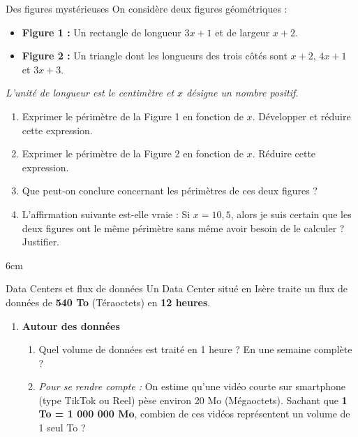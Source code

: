 \documentclass[a4paper]{book}
\begin{document}
{    
\newpage
    
    
    \begin{exerciceTitre}{Des figures mystérieuses}
        On considère deux figures géométriques :
        \begin{itemize}
            \item \textbf{Figure 1 :} Un rectangle de longueur $3x + 1$ et de largeur $x + 2$.
            \item \textbf{Figure 2 :} Un triangle dont les longueurs des trois côtés sont $x + 2$, $4x + 1$ et $3x + 3$.
        \end{itemize}
        \textit{L'unité de longueur est le centimètre et $x$ désigne un nombre positif.}
        
        \begin{enumerate}
            \item Exprimer le périmètre de la Figure 1 en fonction de $x$. Développer et réduire cette expression.
            \item Exprimer le périmètre de la Figure 2 en fonction de $x$. Réduire cette expression.
            \item Que peut-on conclure concernant les périmètres de ces deux figures ? 
            \item L'affirmation suivante est-elle vraie : \og Si $x = 10,5$, alors je suis certain que les deux figures ont le même périmètre sans même avoir besoin de le calculer \fg{} ? Justifier.
        \end{enumerate}
        \begin{ZoneReponse}{6cm}
        \end{ZoneReponse}
    \end{exerciceTitre}
    
        
    \begin{exerciceTitre}{Data Centers et flux de données} 
        Un Data Center situé en Isère traite un flux de données de \textbf{540 To} (Téraoctets) en \textbf{12 heures}.
        
        \begin{enumerate}
            \item \textbf{Autour des données}
            \begin{enumerate}
                \item Quel volume de données est traité en 1 heure ? En une semaine complète ?
                \item \textit{Pour se rendre compte :} On estime qu'une vidéo courte sur smartphone (type TikTok ou Reel) pèse environ 20 Mo (Mégaoctets). Sachant que \textbf{1 To = 1 000 000 Mo}, combien de ces vidéos représentent un volume de 1 seul To ?
            \end{enumerate}
            

\end{enumerate}
\end{exerciceTitre}}
\end{document}
